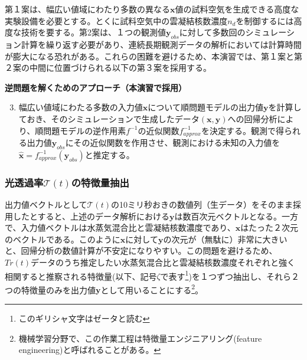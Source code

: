 \documentclass{jsarticle}
\begin{document}
第１案は、幅広い値域にわたり多数の異なる$\bm{x}$値の試料空気を生成できる高度な実験設備を必要とする。とくに試料空気中の雲凝結核数濃度$n_{d}$を制御するには高度な技術を要する。第2案は、１つの観測値$\bm{y}_{obs}$に対して多数回のシミュレーション計算を繰り返す必要があり、連続長期観測データの解析においては計算時間が膨大になる恐れがある。これらの困難を避けるため、本演習では、第１案と第２案の中間に位置づけられる以下の第３案を採用する。\\

\begin{itembox}[l]{\bf{逆問題を解くためのアプローチ（本演習で採用）}}
\begin{enumerate}
\setcounter{enumi}{2}
\item 幅広い値域にわたる多数の入力値$\bm{x}$について順問題モデルの出力値$\bm{y}$を計算しておき、そのシミュレーションで生成したデータ$(\bm{x}, \bm{y})$への回帰分析により、順問題モデルの逆作用素$f^{-1}$の近似関数$f^{-1}_{approx}$を決定する。観測で得られる出力値$\bm{y}_{obs}$にその近似関数を作用させ、観測における未知の入力値を$\bm{\hat{x}}=f^{-1}_{approx}(\bm{y}_{obs})$と推定する。
\end{enumerate}
\end{itembox}

\subsubsection{光透過率$\mathcal{T}(t)$の特徴量抽出}
出力値ベクトルとして$\mathcal{T}(t)$の10ミリ秒おきの数値列（生データ）をそのまま採用したとすると、上述のデータ解析における$\bm{y}$は数百次元ベクトルとなる。一方で、入力値ベクトルは水蒸気混合比と雲凝結核数濃度であり、$\bm{x}$はたった２次元のベクトルである。このように$\bm{x}$に対して$\bm{y}$の次元が（無駄に）非常に大きいと、回帰分析の数値計算が不安定になりやすい。この問題を避けるため、$Tr(t)$データのうち推定したい水蒸気混合比と雲凝結核数濃度それぞれと強く相関すると推察される特徴量(以下、記号$\zeta$で表す\footnote{このギリシャ文字はゼータと読む})を１つずつ抽出し、それら２つの特徴量のみを出力値$\bm{y}$として用いることにする\footnote{機械学習分野で、この作業工程は特徴量エンジニアリング(feature engineering)と呼ばれることがある。}。
\end{document}
